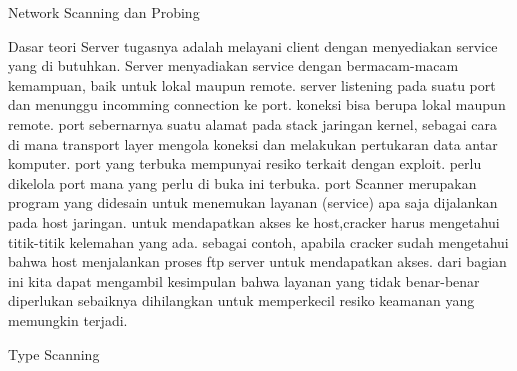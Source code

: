Network Scanning dan Probing

Dasar teori
 Server tugasnya adalah melayani client dengan menyediakan service yang di butuhkan. Server menyadiakan service dengan bermacam-macam kemampuan, baik untuk lokal maupun remote. server listening pada suatu port dan menunggu incomming connection ke port. koneksi bisa berupa lokal maupun remote.
    port sebernarnya suatu alamat pada stack jaringan kernel, sebagai cara di mana transport layer mengola koneksi dan melakukan pertukaran data antar komputer. port yang terbuka mempunyai resiko terkait dengan exploit. perlu dikelola port mana yang perlu di buka ini terbuka.
    port Scanner merupakan program yang didesain untuk menemukan layanan (service) apa saja dijalankan pada host jaringan. untuk mendapatkan akses ke host,cracker harus mengetahui titik-titik kelemahan yang ada. sebagai contoh, apabila cracker sudah mengetahui bahwa host menjalankan proses ftp server untuk mendapatkan akses. dari bagian ini kita dapat mengambil kesimpulan bahwa layanan yang tidak benar-benar diperlukan sebaiknya dihilangkan untuk memperkecil resiko keamanan yang memungkin terjadi.

 Type Scanning

